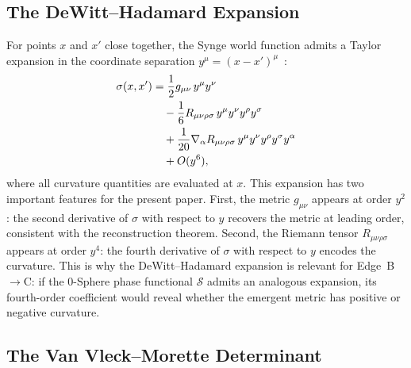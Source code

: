 \documentclass[%
 reprint, amsmath,amssymb, aps, prd, ]{revtex4-2}
\numberwithin{equation}{section}
\newcommand{\SyngeS}{\mathcal{S}}
\begin{document}
\begin{figure}[t!]
\end{figure}


\subsection{The DeWitt--Hadamard Expansion}

For points $x$ and $x'$ close together, the Synge world function admits a Taylor expansion in the coordinate separation $y^\mu = (x-x')^\mu$~\cite{DeWitt1965,Hadamard1923}:
\begin{align}
\sigma(x,x') &= \frac{1}{2}g_{\mu\nu}\,y^\mu y^\nu
\notag\\
&\quad - \frac{1}{6}R_{\mu\nu\rho\sigma}\,y^\mu y^\nu y^\rho y^\sigma
\notag\\
&\quad + \frac{1}{20}\nabla_\alpha R_{\mu\nu\rho\sigma}\,y^\mu y^\nu y^\rho y^\sigma y^\alpha
\notag\\
&\quad + O(y^6),
\label{app:eq:dewitt}
\end{align}
where all curvature quantities are evaluated at $x$.
This expansion has two important features for the present paper.
First, the metric $g_{\mu\nu}$ appears at order $y^2$: the second derivative of $\sigma$ with respect to $y$ recovers the metric at leading order, consistent with the reconstruction theorem.
Second, the Riemann tensor $R_{\mu\nu\rho\sigma}$ appears at order $y^4$: the fourth derivative of $\sigma$ with respect to $y$ encodes the curvature.
This is why the DeWitt--Hadamard expansion is relevant for Edge~B$\to$C: if the 0-Sphere phase functional $\SyngeS$ admits an analogous expansion, its fourth-order coefficient would reveal whether the emergent metric has positive or negative curvature.

\subsection{The Van Vleck--Morette Determinant}
\end{document}
